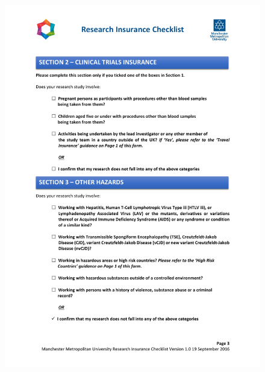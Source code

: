 \documentclass[a4paper,12pt]{report}
\begin{document}
\begin{appendices}
    \begin{figure}[h]
      \centering
      \includegraphics[scale=0.8]{insurance-checklist-3}
    \end{figure}


\end{appendices}
\end{document}
